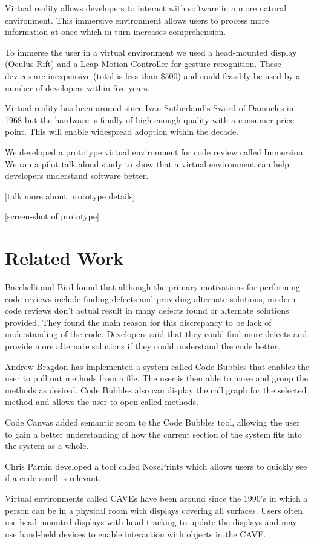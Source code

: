 \documentclass{acm_proc_article-sp}
\begin{document}
Virtual reality allows developers to interact with software in a more natural environment. This immersive environment allows users to process more information at once which in turn increases comprehension.

To immerse the user in a virtual environment we used a head-mounted display (Oculus Rift) and a Leap Motion Controller for gesture recognition. These devices are inexpensive (total is less than \$500) and could feasibly be used by a number of developers within five years.

Virtual reality has been around since Ivan Sutherland's Sword of Damocles in 1968 but the hardware is finally of high enough quality with a consumer price point. This will enable widespread adoption within the decade.

We developed a prototype virtual environment for code review called Immersion. We ran a pilot talk aloud study to show that a virtual environment can help developers understand software better. 

[talk more about prototype details]

[screen-shot of prototype]

\section{Related Work}
Bacchelli and Bird found that although the primary motivations for performing code reviews include finding defects and providing alternate solutions, modern code reviews don't actual result in many defects found or alternate solutions provided.  They found the main reason for this discrepancy to be lack of understanding of the code.  Developers said that they could find more defects and provide more alternate solutions if they could understand the code better.
 
Andrew Bragdon has implemented a system called Code Bubbles that enables the user to pull out methods from a file. The user is then able to move and group the methods as desired.  Code Bubbles also can display the call graph for the selected method and allows the user to open called methods.

Code Canvas added semantic zoom to the Code Bubbles tool, allowing the user to gain a better understanding of how the current section of the system fits into the system as a whole.

Chris Parnin developed a tool called NosePrints which allows users to quickly see if a code smell is relevant.

Virtual environments called CAVEs have been around since the 1990's in which a person can be in a physical room with displays covering all surfaces.  Users often use head-mounted displays with head tracking to update the displays and may use hand-held devices to enable interaction with objects in the CAVE.
\end{document}
